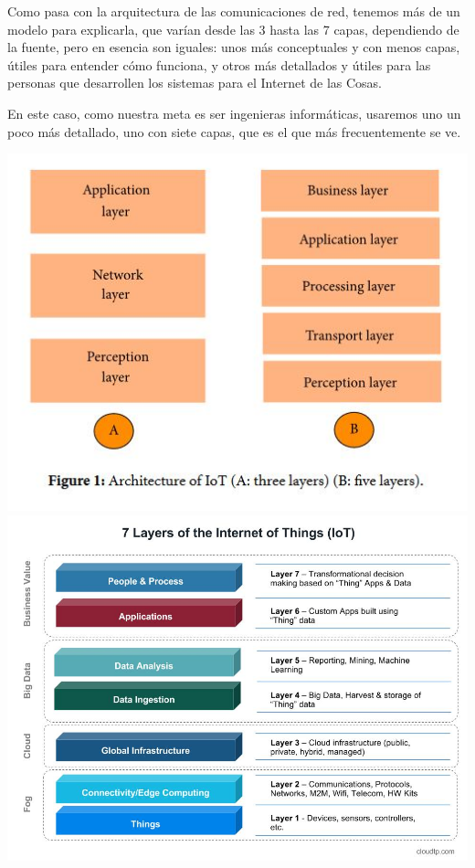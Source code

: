 \documentclass{article}
\begin{document}
Como pasa con la arquitectura de las comunicaciones de red, tenemos más de un modelo para explicarla, que varían desde las 3 hasta las 7 capas, dependiendo de la fuente, pero en esencia son iguales: unos más conceptuales y con menos capas, útiles para entender cómo funciona, y otros más detallados y útiles para las personas que desarrollen los sistemas para el Internet de las Cosas.

En este caso, como nuestra meta es ser ingenieras informáticas, usaremos uno un poco más detallado, uno con siete capas, que es el que más frecuentemente se ve.

\begin{center}
\includegraphics[scale=0.3]{images/3y5.jpg}
\hfill
\includegraphics[scale=0.2]{images/7.jpg}
\end{center}
\end{document}
